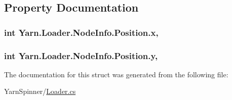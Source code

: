 \subsection{Property Documentation}
\hypertarget{a00125_a6b40110781090293fbcd2d6f7695ae4d}{
\subsubsection[{x}]{\setlength{\rightskip}{0pt plus 5cm}int Yarn.\-Loader.\-Node\-Info.\-Position.\-x\hspace{0.3cm}{\ttfamily [get]}, {\ttfamily [set]}}}\label{a00125_a6b40110781090293fbcd2d6f7695ae4d}
\hypertarget{a00125_a390d560bd9faa3a32d8a0489c69be9e0}{
\subsubsection[{y}]{\setlength{\rightskip}{0pt plus 5cm}int Yarn.\-Loader.\-Node\-Info.\-Position.\-y\hspace{0.3cm}{\ttfamily [get]}, {\ttfamily [set]}}}\label{a00125_a390d560bd9faa3a32d8a0489c69be9e0}


The documentation for this struct was generated from the following file\-:\begin{DoxyCompactItemize}
\item 
Yarn\-Spinner/\hyperlink{a00268}{Loader.\-cs}\end{DoxyCompactItemize}

